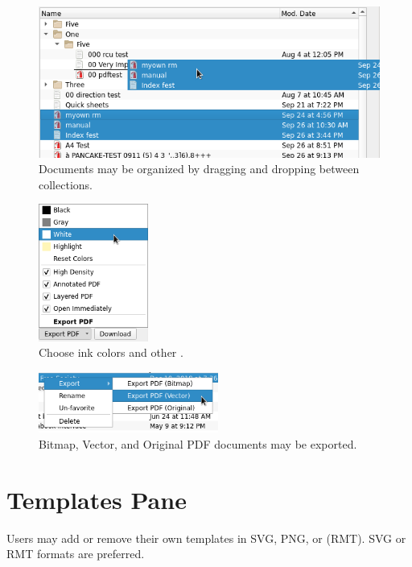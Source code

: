 \documentclass{memoir}
\begin{document}
{\newpage

\begin{figure}[h]
  \centering
  \includegraphics[width=\linewidth]{images/notebooks-dragdrop.png}
  \caption{Documents may be organized by dragging and dropping between collections.}
  \label{fig:docexport}
\end{figure}
\vfill

\begin{figure}[h]
  \centering
  \includegraphics[height=4.5cm]{images/pdf-export-options.png}
  \caption{Choose ink colors and other .}
  \label{fig:pdfexport}
\end{figure}
\vfill


\vfill


\begin{figure}[h]
  \centering
  \includegraphics[height=2cm]{images/context-export.png}
  \caption{Bitmap, Vector, and Original PDF documents may be exported.}
  \label{fig:}
\end{figure}



\newpage
\section{Templates Pane}
\label{sec:templatespane}
Users may add or remove their own templates in SVG, PNG, or  (RMT). SVG or RMT formats are preferred.

}
\end{document}
